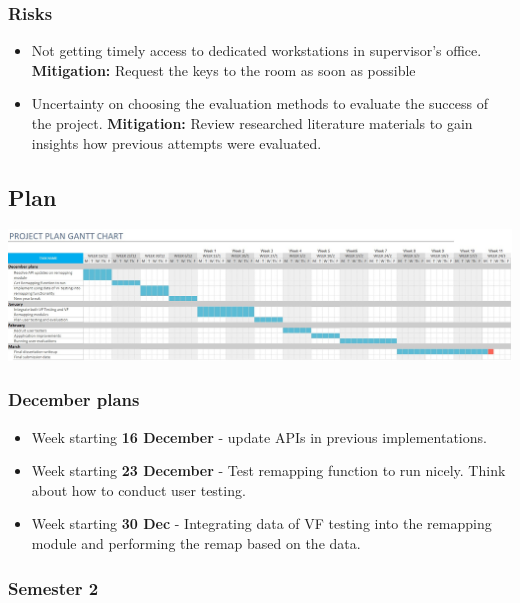 \documentclass[11pt]{article}
\begin{document}
\subsubsection{Risks}\label{risks}

\begin{itemize}
    \item   Not getting timely access to dedicated workstations in supervisor's office. \textbf{Mitigation:} Request the keys to the room as soon as possible
    \item   Uncertainty on choosing the evaluation methods to evaluate the success of the project. \textbf{Mitigation: } Review researched literature materials to gain insights how previous attempts were evaluated.


\end{itemize}

\subsection{Plan}\label{plan}

\includegraphics[width=\textwidth]{images/INP-full-ganttChart.jpg}

\subsubsection{December plans}
\begin{itemize}
    \item Week starting \textbf{16 December} - update APIs in previous implementations.
    \item Week starting \textbf{23 December} - Test remapping function to run nicely. Think about how to conduct user testing.
    \item Week starting \textbf{30 Dec} - Integrating data of VF testing into the remapping module and performing the remap based on the data.
    
\end{itemize}

\subsubsection{Semester 2}
\end{document}

